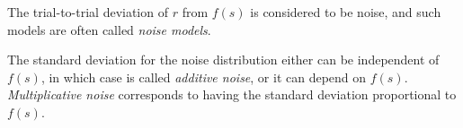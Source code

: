 \begin{defn}
  The trial-to-trial deviation of $r$ from $f ( s )$ is
considered to be noise, and such models are often called \emph{noise models}.
\end{defn}
\begin{defn}
  The standard deviation for the noise distribution either can be independent of 
  $f ( s )$, in which case is called \emph{additive noise}, or it can
depend on $f ( s )$. \emph{Multiplicative noise} corresponds to having the standard
deviation proportional to $f ( s )$.
\end{defn}



